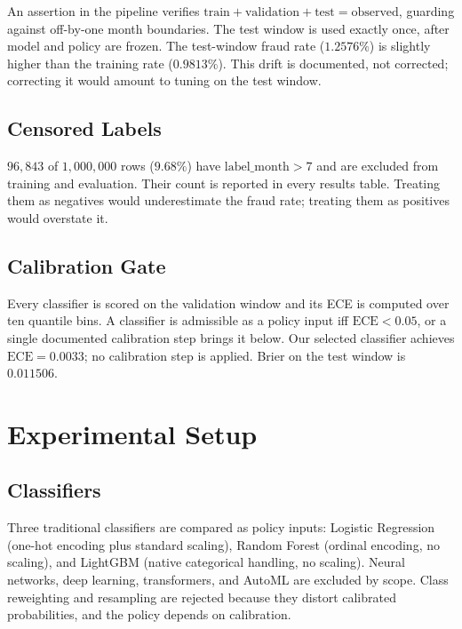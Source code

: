\documentclass[conference]{IEEEtran}
\begin{document}
An assertion in the pipeline verifies $\text{train} + \text{validation} +
\text{test} = \text{observed}$, guarding against off-by-one month
boundaries. The test window is used exactly once, after model and policy
are frozen. The test-window fraud rate ($1.2576\%$) is slightly higher than
the training rate ($0.9813\%$). This drift is documented, not
corrected; correcting it would amount to tuning on the test window.

\subsection{Censored Labels}

$96{,}843$ of $1{,}000{,}000$ rows ($9.68\%$) have
$\text{label\_month} > 7$ and are excluded from training and evaluation.
Their count is reported in every results table. Treating them as negatives
would underestimate the fraud rate; treating them as positives would
overstate it.

\subsection{Calibration Gate}

Every classifier is scored on the validation window and its ECE is computed
over ten quantile bins. A classifier is admissible as a policy input iff
$\text{ECE} < 0.05$, or a single documented calibration step brings it
below. Our selected classifier achieves $\text{ECE} = 0.0033$; no
calibration step is applied. Brier on the test window is $0.011506$.

\section{Experimental Setup}
\label{sec:setup}

\subsection{Classifiers}

Three traditional classifiers are compared as policy inputs: Logistic
Regression (one-hot encoding plus standard scaling), Random Forest (ordinal
encoding, no scaling), and LightGBM (native categorical handling, no
scaling). Neural networks, deep learning, transformers, and AutoML are
excluded by scope. Class reweighting and resampling are rejected because
they distort calibrated probabilities, and the policy depends on calibration.
\end{document}
